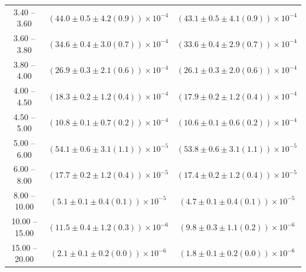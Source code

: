 \begin{table}
\begin{center}
\begin{tabular}{ c | c c }
3.40 -- 3.60 & $(44.0\pm0.5\pm4.2(0.9))\times10^{-4}$ & $(43.1\pm0.5\pm4.1(0.9))\times10^{-4}$ \\ 
3.60 -- 3.80 & $(34.6\pm0.4\pm3.0(0.7))\times10^{-4}$ & $(33.6\pm0.4\pm2.9(0.7))\times10^{-4}$ \\ 
3.80 -- 4.00 & $(26.9\pm0.3\pm2.1(0.6))\times10^{-4}$ & $(26.1\pm0.3\pm2.0(0.6))\times10^{-4}$ \\ 
4.00 -- 4.50 & $(18.3\pm0.2\pm1.2(0.4))\times10^{-4}$ & $(17.9\pm0.2\pm1.2(0.4))\times10^{-4}$ \\ 
4.50 -- 5.00 & $(10.8\pm0.1\pm0.7(0.2))\times10^{-4}$ & $(10.6\pm0.1\pm0.6(0.2))\times10^{-4}$ \\ 
5.00 -- 6.00 & $(54.1\pm0.6\pm3.1(1.1))\times10^{-5}$ & $(53.8\pm0.6\pm3.1(1.1))\times10^{-5}$ \\ 
6.00 -- 8.00 & $(17.7\pm0.2\pm1.2(0.4))\times10^{-5}$ & $(17.4\pm0.2\pm1.2(0.4))\times10^{-5}$ \\ 
8.00 -- 10.00 & $(5.1\pm0.1\pm0.4(0.1))\times10^{-5}$ & $(4.7\pm0.1\pm0.4(0.1))\times10^{-5}$ \\ 
10.00 -- 15.00 & $(11.5\pm0.4\pm1.2(0.3))\times10^{-6}$ & $(9.8\pm0.3\pm1.1(0.2))\times10^{-6}$ \\ 
15.00 -- 20.00 & $(2.1\pm0.1\pm0.2(0.0))\times10^{-6}$ & $(1.8\pm0.1\pm0.2(0.0))\times10^{-6}$ \\ 
\hline
\end{tabular}
\end{center}
\end{table}
 
